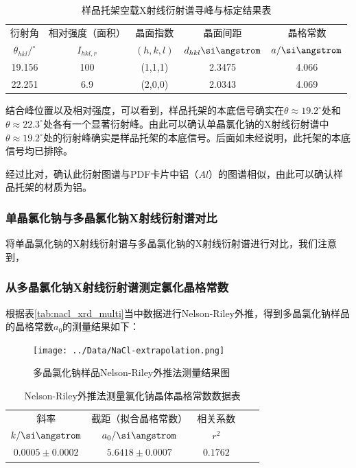 \documentclass{thuemp}
\begin{document}
\begin{table}[H]
    \centering
    \captionnamefont{\wuhao\bf\heiti}
    \captiontitlefont{\wuhao\bf\heiti}
    \caption{样品托架空载X射线衍射谱寻峰与标定结果表}
    \label{tab:nacl_xrd_holder}
    \liuhao
    \begin{tabular}{ccccc}
        \toprule
        衍射角 & 相对强度（面积）& 晶面指数 & 晶面间距 & 晶格常数 \\
        $\theta_{hkl}/^\circ$ & $I_{hkl,r}$ & $(h,k,l)$ & $d_{hkl}\text{\si\angstrom}$ & $a/\text{\si\angstrom}$\\
        \midrule
        19.156 & 100 & (1,1,1) & 2.3475 & 4.066 \\
        22.251 & 6.9 & (2,0,0) & 2.0343 & 4.069 \\
        \bottomrule
    \end{tabular}
\end{table}

结合峰位置以及相对强度，可以看到，样品托架的本底信号确实在$\theta \approx 19.2^\circ$处和$\theta \approx 22.3^\circ$处各有一个显著衍射峰。由此可以确认单晶氯化钠的X射线衍射谱中$\theta \approx 19.2^\circ$处的衍射峰确实是样品托架的本底信号。后面如未经说明，此托架的本底信号均已排除。

经过比对，确认此衍射图谱与PDF卡片中铝（$Al$）的图谱相似，由此可以确认样品托架的材质为铝。

\subsubsection{单晶氯化钠与多晶氯化钠X射线衍射谱对比}

将单晶氯化钠的X射线衍射谱与多晶氯化钠的X射线衍射谱进行对比，我们注意到，

\subsubsection{从多晶氯化钠X射线衍射谱测定氯化晶格常数}

根据表\ref{tab:nacl_xrd_multi}当中数据进行Nelson-Riley外推，得到多晶氯化钠样品的晶格常数$a_0$的测量结果如下：

\begin{figure}[H]
    \centering
    \texttt{[image: ../Data/NaCl-extrapolation.png]}
    \caption{多晶氯化钠样品Nelson-Riley外推法测量结果图}
    \label{fig:nacl_xrd_extrapol}
\end{figure}

\begin{table}[H]
    \centering
    \captionnamefont{\wuhao\bf\heiti}
    \captiontitlefont{\wuhao\bf\heiti}
    \caption{Nelson-Riley外推法测量氯化钠晶体晶格常数数据表}
    \label{tab:nacl_xrd_extrapol}
    \liuhao
    \begin{tabular}{ccccc}
        \toprule
        斜率 & 截距（拟合晶格常数） & 相关系数 \\
        $k/\text{\si\angstrom}$ & $a_0/\text{\si\angstrom}$ & $r^2$ \\
        \midrule
        $0.0005 \pm 0.0002$ & $5.6418 \pm 0.0007$ & $0.1762$ \\
        \bottomrule
    \end{tabular}
\end{table}
\end{document}
